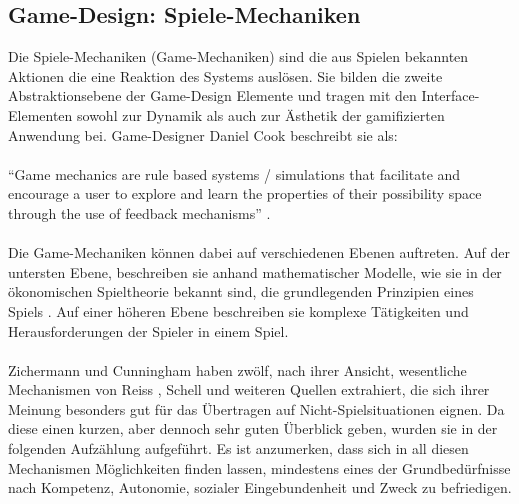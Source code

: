 \documentclass[a4paper,12pt]{scrartcl}
\begin{document}
\subsection{Game-Design: Spiele-Mechaniken}
Die Spiele-Mechaniken (Game-Mechaniken) sind die aus Spielen bekannten Aktionen die eine Reaktion des Systems auslösen.  Sie bilden die zweite Abstraktionsebene der Game-Design Elemente und tragen mit den Interface-Elementen sowohl zur Dynamik als auch zur Ästhetik der gamifizierten Anwendung bei. Game-Designer Daniel Cook beschreibt sie als:
\\\\
\enquote{Game mechanics are rule based systems / simulations that facilitate and encourage a user to explore and learn the properties of their possibility space through the use of feedback mechanisms} \cite{GameMechanics2006}. 
\\\\
Die Game-Mechaniken können dabei auf verschiedenen Ebenen auftreten. Auf der untersten Ebene, beschreiben sie anhand mathematischer Modelle, wie sie in der ökonomischen Spieltheorie bekannt sind, die grundlegenden Prinzipien eines Spiels \cite{Schell2014}. Auf einer höheren Ebene beschreiben sie komplexe Tätigkeiten und Herausforderungen der Spieler in einem Spiel.
\\\\
Zichermann und Cunningham \cite{Zichermann2011} haben zwölf, nach ihrer Ansicht, wesentliche Mechanismen von Reiss \cite{Reiss2009}, Schell \cite{Schell2014} und weiteren Quellen extrahiert, die sich ihrer Meinung besonders gut für das Übertragen auf Nicht-Spielsituationen eignen. Da diese einen kurzen, aber dennoch sehr guten Überblick geben, wurden sie in der folgenden Aufzählung aufgeführt. Es ist anzumerken, dass sich in all diesen Mechanismen Möglichkeiten finden lassen, mindestens eines der Grundbedürfnisse nach Kompetenz, Autonomie, sozialer Eingebundenheit und Zweck zu befriedigen.     
\end{document}
